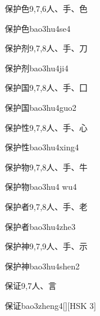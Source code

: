 \begin{Entry}{保护色}{9,7,6}{⼈、⼿、⾊}
  \begin{Phonetics}{保护色}{bao3hu4se4}
  \end{Phonetics}
\end{Entry}

\begin{Entry}{保护剂}{9,7,8}{⼈、⼿、⼑}
  \begin{Phonetics}{保护剂}{bao3hu4ji4}
  \end{Phonetics}
\end{Entry}

\begin{Entry}{保护国}{9,7,8}{⼈、⼿、⼞}
  \begin{Phonetics}{保护国}{bao3hu4guo2}
  \end{Phonetics}
\end{Entry}

\begin{Entry}{保护性}{9,7,8}{⼈、⼿、⼼}
  \begin{Phonetics}{保护性}{bao3hu4xing4}
  \end{Phonetics}
\end{Entry}

\begin{Entry}{保护物}{9,7,8}{⼈、⼿、⽜}
  \begin{Phonetics}{保护物}{bao3hu4 wu4}
  \end{Phonetics}
\end{Entry}

\begin{Entry}{保护者}{9,7,8}{⼈、⼿、⽼}
  \begin{Phonetics}{保护者}{bao3hu4zhe3}
  \end{Phonetics}
\end{Entry}

\begin{Entry}{保护神}{9,7,9}{⼈、⼿、⽰}
  \begin{Phonetics}{保护神}{bao3hu4shen2}
  \end{Phonetics}
\end{Entry}

\begin{Entry}{保证}{9,7}{⼈、⾔}
  \begin{Phonetics}{保证}{bao3zheng4}[][HSK 3]
  \end{Phonetics}
\end{Entry}

